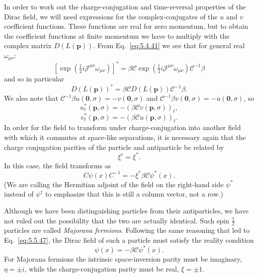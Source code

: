 In order to work out the charge-conjugation and time-reversal properties of
the Dirac field, we will need expressions for the complex-conjugates of the
$u$ and $v$ coefficient functions. These functions are real for zero momentum,
but to obtain the coefficient functions at finite momentum we have to multiply
with the complex matrix $D(L(\mathbf p))$. From Eq.~\eqref{eq:5.4.41} we see that for
general real $\omega_{\mu\nu}$:
\[
[\exp(\tfrac12i\mathcal{J}^{\mu\nu}\omega_{\mu\nu})]^*
=\beta\mathcal{C}\exp(\tfrac12i\mathcal{J}^{\mu\nu}\omega_{\mu\nu})
\mathcal{C}^{-1}\beta
\]
and so in particular
\[
D(L(\mathbf p))^*=\beta\mathcal{C}D(L(\mathbf p))\mathcal{C}^{-1}\beta.
\]
We also note that $\mathcal{C}^{-1}\beta u(\mathbf0,\sigma)=-v(\mathbf0,\sigma)$
and $\mathcal{C}^{-1}\beta v(\mathbf0,\sigma)=-u(\mathbf0,\sigma)$, so
\begin{equation}
u_\ell^*(\mathbf p,\sigma)=-(\beta\mathcal{C}v(\mathbf p,\sigma))_\ell,
\tag{5.5.44}\label{eq:5.5.44}
\end{equation}
\begin{equation}
v_\ell^*(\mathbf p,\sigma)=-(\beta\mathcal{C}u(\mathbf p,\sigma))_\ell.
\tag{5.5.45}\label{eq:5.5.45}
\end{equation}
In order for the field to transform under charge-conjugation into another
field with which it commutes at space-like separations, it is necessary again
that the charge conjugation parities of the particle and antiparticle be
related by
\begin{equation}
\xi^c=\xi^*.
\tag{5.5.46}\label{eq:5.5.46}
\end{equation}
In this case, the field transforms as
\begin{equation}
C\psi(x)C^{-1}=-\xi^*\beta\mathcal{C}\psi^*(x).
\tag{5.5.47}\label{eq:5.5.47}
\end{equation}
(We are calling the Hermitian adjoint of the field on the right-hand side
$\psi^*$ instead of $\psi^\dagger$ to emphasize that this is still a column
vector, not a row.)

Although we have been distinguishing particles from their antiparticles, we
have not ruled out the possibility that the two are actually identical. Such
spin $\frac12$ particles are called \emph{Majorana fermions}. Following the
same reasoning that led to Eq.~\eqref{eq:5.5.47}, the Dirac field of such a particle
must satisfy the reality condition
\begin{equation}
\psi(x)=-\beta\mathcal{C}\psi^*(x).
\tag{5.5.48}\label{eq:5.5.48}
\end{equation}
For Majorana fermions the intrinsic space-inversion parity must be imaginary,
$\eta=\mathbin{\pm}i$, while the charge-conjugation parity must be real,
$\xi=\mathbin{\pm}1$.

